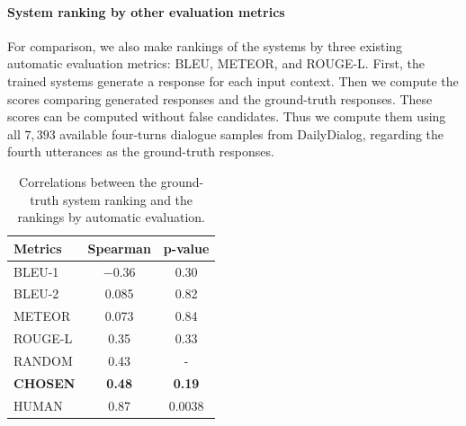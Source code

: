 \documentclass[11pt,a4paper]{article}
\begin{document}
\paragraph{System ranking by other evaluation metrics}
For comparison, we also make rankings of the systems by three existing automatic evaluation metrics: BLEU, METEOR, and ROUGE-L.
First, the trained systems generate a response for each input context.
Then we compute the scores comparing generated responses and the ground-truth responses.
These scores can be computed without false candidates.
Thus we compute them using all $7,393$ available four-turns dialogue samples from DailyDialog, regarding the fourth utterances as the ground-truth responses.

%

\begin{table}[t]
\centering
\begin{tabular}{@{}lcc@{}}
\toprule
Metrics & Spearman & p-value \\ \midrule
BLEU-1  & \hspace*{0.2mm}$-$0.36    & 0.30    \\
BLEU-2  & \hspace*{4.2mm}0.085    & 0.82    \\
METEOR  & \hspace*{4.2mm}0.073    & 0.84    \\
ROUGE-L   & \hspace*{2.7mm}0.35     & 0.33    \\ \midrule %
RANDOM  & \hspace*{2.7mm}0.43     & -    \\
{\bf CHOSEN}  &\hspace*{1.9mm} {\bf 0.48}     & {\bf 0.19}    \\ \midrule %
HUMAN  & \hspace*{2.7mm}0.87     & \hspace*{3.1mm}0.0038  \\ \bottomrule
\end{tabular}
\caption{Correlations between the ground-truth system ranking and the rankings by automatic evaluation.}
\label{tab:correlation}
\end{table}
\end{document}
